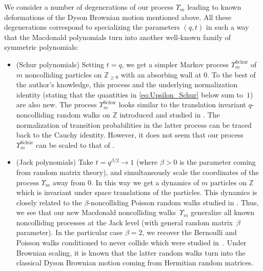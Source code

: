 \documentclass[pdftex]{sigma}
\numberwithin{equation}{section}
\begin{document}
We consider a number of degenerations of our process
$\Upsilon_m$ leading to known deformations
of the Dyson Brownian motion mentioned above.
All these degenerations correspond to specializing the
parameters $(q,t)$ in such a way that the Macdonald
polynomials turn into another well-known family of symmetric polynomials:
\begin{itemize}\itemsep=0pt
	\item (Schur polynomials)
		Setting $t=q$, we get a simpler
		Markov process
		$\Upsilon_m^{\mathrm{Schur}}$
		of $m$ noncolliding particles
		on $\mathbb{Z}_{\ge0}$
		with an absorbing wall at $0$.
		To the best of the author's knowledge,
		this process and the underlying normalization identity
		(stating that the quantities in \eqref{eq:Upsilon_Schur} below
		sum to~$1$) are also new.
		The process $\Upsilon_m^{\mathrm{Schur}}$
		looks similar to the translation invariant
		$q$-noncolliding random walks on $\mathbb{Z}$
		introduced
		and studied in
		\cite{BG2011non}.
		The
		normalization of transition probabilities
		in the latter process
		can be traced back to the Cauchy
		identity. However, it does not seem that our process
		$\Upsilon_m^{\mathrm{Schur}}$ can be scaled to that of
		\cite{BG2011non}.

	\item (Jack polynomials)
		Take $t=q^{\beta/2}\to 1$ (where $\beta>0$ is the parameter
		coming from random matrix theory),
		and simultaneously
		scale the coordinates of the process $\Upsilon_m$
		away from $0$. In this way we get a dynamics of $m$
		particles on $\mathbb{Z}$ which is invariant under
		space translations of the particles.
		This dynamics is closely related to the
		$\beta$-noncolliding Poisson random walks
		studied in \cite{GorinShkolnikov2014,huang2021beta}.
		Thus, we see that our new Macdonald noncolliding walks~$\Upsilon_m$ generalize all known noncolliding processes
		at the Jack level (with general random matrix~$\beta$ parameter).
		In the particular case $\beta=2$,
		we recover the Bernoulli and Poisson
		walks conditioned to never collide
		which were studied in~\cite{konig2002non}. Under Brownian scaling,
		it is known that the latter random walks turn into the
		classical Dyson Brownian motion coming from Hermitian
		random matrices.


\end{itemize}
\end{document}
